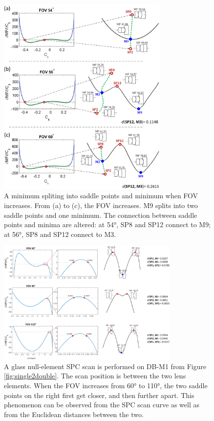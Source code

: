 \begin{figure}[h!]
    \centering
    \includegraphics[width=0.75\textwidth]{chapter-3/figures/SystemBorn.png}
    \caption{A minimum spliting into saddle points and minimum when FOV increases. From (a) to (c), the FOV increases. M9 splits into two saddle points and one minimum. The connection between saddle points and minima are altered: at 54°, SP8 and SP12 connect to M9; at 56°, SP8 and SP12 connect to M3.}
    \label{fig:systemborn}
\end{figure}

\begin{figure}[h!]
    \centering
    \includegraphics[width=0.8\textwidth]{chapter-3/figures/SystemReborn_vt.png}
    \caption{A glass null-element SPC scan is performed on DB-M1 from Figure \ref{fig:single2double}. The scan position is between the two lens elements. When the FOV increases from 60° to 110°, the two saddle points on the right first get closer, and then further apart. This phenomenon can be observed from the SPC scan curve as well as from the Euclidean distances between the two.}
    \label{fig:systemreborn}
\end{figure}

